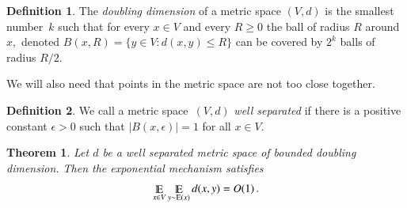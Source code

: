 \documentclass[letterpaper,11pt]{article}
\newtheorem{theorem}{Theorem}[section]
\theoremstyle{definition}
\newtheorem{definition}{Definition}[section]
\renewcommand{\mathbb}{\varmathbb}
\newcommand{\Esymb}{\mathbb{E}}
\DeclareMathOperator*{\E}{\Esymb}
\newcommand{\mper}{\,.}
\newcommand\ExM{\mathrm{E}}
\begin{document}
\begin{definition}
The \emph{doubling dimension} of a metric space $(V,d)$ is the smallest
number~$k$ such that for every $x\in V$ and every $R\ge0$ the ball of radius
$R$ around $x,$ denoted $B(x,R)=\{y\in V\colon d(x,y)\le R\}$ can be covered
by $2^k$ balls of radius $R/2.$
\end{definition}

We will also need that points in the metric space are not too close together.

\begin{definition}
We call a metric space~$(V,d)$ \emph{well separated} if there is a positive
constant $\epsilon>0$ such that $|B(x,\epsilon)|=1$ for all $x\in V.$
\end{definition}

\begin{theorem}\label{thm:expmech}
Let $d$ be a well separated metric space of bounded doubling dimension.
Then the exponential mechanism satisfies
\[
\E_{x\in V}\E_{y\sim \ExM(x)}d(x,y)= O(1)\mper
\]
\end{theorem}
\end{document}

